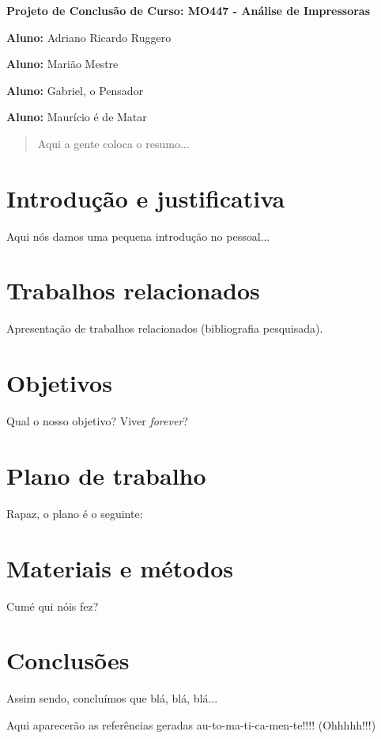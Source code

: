 \documentclass[12pt,twoside,a4paper]{article}
\begin{document}
\vskip 15mm

\begin{center} 
\textbf{Projeto de Conclusão de Curso: MO447 - Análise de Impressoras}
\end{center}

\vskip 5mm

\textbf{Aluno:} Adriano Ricardo Ruggero

\textbf{Aluno:} Marião Mestre

\textbf{Aluno:} Gabriel, o Pensador

\textbf{Aluno:} Maurício é de Matar

\vskip 20mm

\begin{abstract}

Aqui a gente coloca o resumo...

\end{abstract}

\newpage
\pagestyle{plain}
\headheight 0.0cm
\headsep 0.0cm
\footskip 2.2cm

\section{Introdução e justificativa}
\label{sec:introduction}

Aqui nós damos uma pequena introdução no pessoal...

\section{Trabalhos relacionados}
\label{sec:related}

Apresentação de trabalhos relacionados (bibliografia pesquisada).	


\section{Objetivos}
\label{sec:objects}

Qual o nosso objetivo? Viver \textit{forever}?

\section{Plano de trabalho}
\label{sec:plan}

Rapaz, o plano é o seguinte:
 
\section{Materiais e métodos}
\label{sec:materials}

Cumé qui nóis fez?	

\section{Conclusões}
\label{sec:conclusions}

Assim sendo, concluímos que blá, blá, blá...

{}


Aqui aparecerão as referências geradas au-to-ma-ti-ca-men-te!!!! (Ohhhhh!!!)
\end{document}
